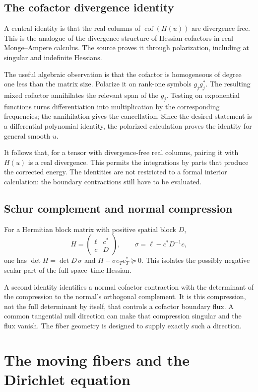 \documentclass[11pt,a4paper]{article}
\numberwithin{equation}{section}
\theoremstyle{definition}
\theoremstyle{remark}
\begin{document}
\subsection{The cofactor divergence identity}
A central identity is that the real columns of $\operatorname{cof}(H(u))$ are
divergence free. This is the analogue of the divergence structure of Hessian
cofactors in real Monge--Ampere calculus. The source proves it through
polarization, including at singular and indefinite Hessians.

The useful algebraic observation is that the cofactor is homogeneous of degree
one less than the matrix size. Polarize it on rank-one symbols $g_jg_j^*$.
The resulting mixed cofactor annihilates the relevant span of the $g_j$.
Testing on exponential functions turns differentiation into multiplication by
the corresponding frequencies; the annihilation gives the cancellation.
Since the desired statement is a differential polynomial identity, the
polarized calculation proves the identity for general smooth $u$.

It follows that, for a tensor with divergence-free real columns, pairing it
with $H(u)$ is a real divergence. This permits the integrations by parts that
produce the corrected energy. The identities are not restricted to a formal
interior calculation: the boundary contractions still have to be evaluated.

\subsection{Schur complement and normal compression}
For a Hermitian block matrix with positive spatial block $D$,
\[
 H=\begin{pmatrix}\ell&c^*\\c&D\end{pmatrix},\qquad
 \sigma=\ell-c^*D^{-1}c,
\]
one has $\det H=\det D\,\sigma$ and
$H-\sigma e_Te_T^*\succeq0$. This isolates the possibly negative scalar
part of the full space--time Hessian.

A second identity identifies a normal cofactor contraction with the determinant
of the compression to the normal's orthogonal complement. It is this
compression, not the full determinant by itself, that controls a cofactor
boundary flux. A common tangential null direction can make that compression
singular and the flux vanish. The fiber geometry is designed to supply exactly
such a direction.

\section{The moving fibers and the Dirichlet equation}
\label{sec:dirichlet}
\end{document}
